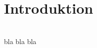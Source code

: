 \chapter{Introduktion}
\label{ch:Intro}
\\

bla bla bla \citep{Jacobsen:2008M,Johannsen:2009M,Gympd,Michelsen:2011M,Dolin:2007M,Harlen:2011:M}